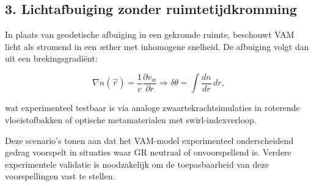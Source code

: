 \subsection*{3. Lichtafbuiging zonder ruimtetijdkromming}

In plaats van geodetische afbuiging in een gekromde ruimte, beschouwt VAM licht als stromend in een æther met inhomogene snelheid. De afbuiging volgt dan uit een brekingsgradiënt:

\begin{equation}
    \nabla n(\vec{r}) = \frac{1}{c} \frac{\partial v_\text{\ae}}{\partial r} \Rightarrow \delta \theta = \int \frac{dn}{dr} \, dr,
    \label{eq:light_bending}
\end{equation}

wat experimenteel testbaar is via analoge zwaartekrachtsimulaties in roterende vloeistofbakken of optische metamaterialen met swirl-indexverloop.

\bigskip

Deze scenario’s tonen aan dat het VAM-model experimenteel onderscheidend gedrag voorspelt in situaties waar GR neutraal of onvoorspellend is. Verdere experimentele validatie is noodzakelijk om de toepasbaarheid van deze voorspellingen vast te stellen.